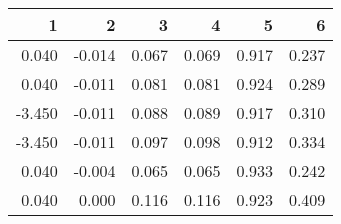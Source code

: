 \begin{table}[ht]
\centering
\begin{tabular}{rrrrrr}
  \hline
1 & 2 & 3 & 4 & 5 & 6 \\ 
  \hline
0.040 & -0.014 & 0.067 & 0.069 & 0.917 & 0.237 \\ 
  0.040 & -0.011 & 0.081 & 0.081 & 0.924 & 0.289 \\ 
  -3.450 & -0.011 & 0.088 & 0.089 & 0.917 & 0.310 \\ 
  -3.450 & -0.011 & 0.097 & 0.098 & 0.912 & 0.334 \\ 
  0.040 & -0.004 & 0.065 & 0.065 & 0.933 & 0.242 \\ 
  0.040 & 0.000 & 0.116 & 0.116 & 0.923 & 0.409 \\ 
   \hline
\end{tabular}
\end{table}
